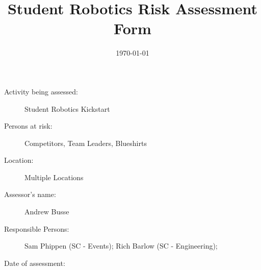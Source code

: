 \documentclass[12pt,a4paper]{scrartcl}
\title{Student Robotics Risk Assessment Form}
\begin{document}
\maketitle

\begin{description}
\item[Activity being assessed:] Student Robotics Kickstart
\item[Persons at risk:] Competitors, Team Leaders, Blueshirts
\item[Location:] Multiple Locations
\end{description}

\begin{description}
\item[Assessor's name:] Andrew Busse
\item[Responsible Persons:] Sam Phippen (SC - Events); Rich Barlow (SC -
Engineering); 
\item[Date of assessment:] \date{\today}
\end{description}
\clearpage

\newcommand{\risk}[4]{
 #1 & #2 & #3 & #4 \\
}
\end{document}
